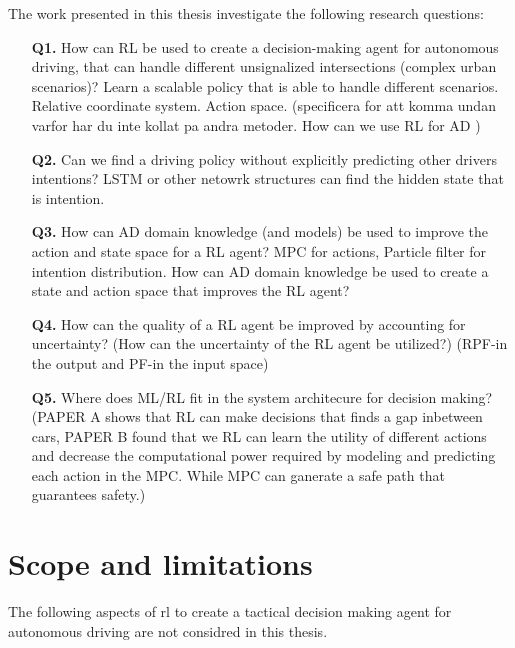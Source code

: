 The work presented in this thesis investigate the following research questions:
\begin{enumerate}
	\item[\textbf{Q1.}] How can RL be used to create a decision-making agent for autonomous driving, that can handle different unsignalized intersections (complex urban scenarios)? Learn a scalable policy that is able to handle different scenarios. Relative coordinate system. Action space. 
	(specificera for att komma undan varfor har du inte kollat pa andra metoder. How can we use RL for AD )
	\item[\textbf{Q2.}] Can we find a driving policy without explicitly predicting other drivers intentions?
	LSTM or other netowrk structures can find the hidden state that is intention. 
	\item[\textbf{Q3.}] How can AD domain knowledge (and models) be used to improve the action and state space for a RL agent? MPC for actions, Particle filter for intention distribution. How can AD domain knowledge be used to create a state and action space that improves the RL agent?
	\item[\textbf{Q4.}] How can the quality of a RL agent be improved by accounting for uncertainty?
	(How can the uncertainty of the RL agent be utilized?) (RPF-in the output and PF-in the input space)

	\item[\textbf{Q5.}] Where does ML/RL fit in the system architecure for decision making?
	(PAPER A shows that RL can make decisions that finds a gap inbetween cars, PAPER B found that we RL can learn the utility of different actions and decrease the computational power required by modeling and predicting each action in the MPC. While MPC can ganerate a safe path that guarantees safety.) 
\end{enumerate}



\section{Scope and limitations}
The following aspects of \gls{rl} to create a tactical decision making agent for autonomous driving are not considred in this thesis. 

